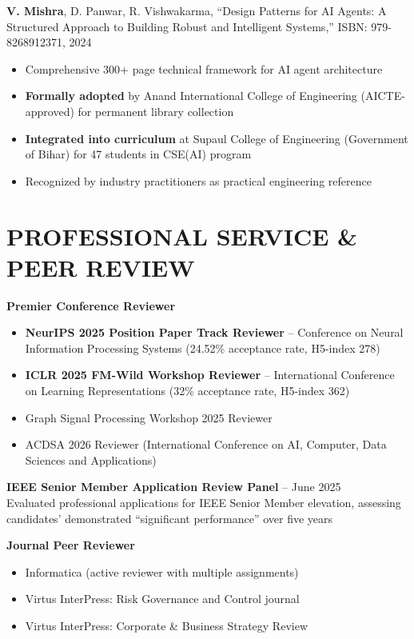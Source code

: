 \documentclass[11pt]{article}
\begin{document}
\textbf{V. Mishra}, D. Panwar, R. Vishwakarma, ``Design Patterns for AI Agents: A Structured Approach to Building Robust and Intelligent Systems,'' ISBN: 979-8268912371, 2024
\begin{itemize}
    \item Comprehensive 300+ page technical framework for AI agent architecture
    \item \textbf{Formally adopted} by Anand International College of Engineering (AICTE-approved) for permanent library collection
    \item \textbf{Integrated into curriculum} at Supaul College of Engineering (Government of Bihar) for 47 students in CSE(AI) program
    \item Recognized by industry practitioners as practical engineering reference
\end{itemize}

\section*{PROFESSIONAL SERVICE \& PEER REVIEW}

\textbf{Premier Conference Reviewer}
\begin{itemize}
    \item \textbf{NeurIPS 2025 Position Paper Track Reviewer} -- Conference on Neural Information Processing Systems (24.52\% acceptance rate, H5-index 278)
    \item \textbf{ICLR 2025 FM-Wild Workshop Reviewer} -- International Conference on Learning Representations (32\% acceptance rate, H5-index 362)
    \item Graph Signal Processing Workshop 2025 Reviewer
    \item ACDSA 2026 Reviewer (International Conference on AI, Computer, Data Sciences and Applications)
\end{itemize}

\textbf{IEEE Senior Member Application Review Panel} -- June 2025\\
Evaluated professional applications for IEEE Senior Member elevation, assessing candidates' demonstrated ``significant performance'' over five years

\textbf{Journal Peer Reviewer}
\begin{itemize}
    \item Informatica (active reviewer with multiple assignments)
    \item Virtus InterPress: Risk Governance and Control journal
    \item Virtus InterPress: Corporate \& Business Strategy Review
\end{itemize}
\end{document}
